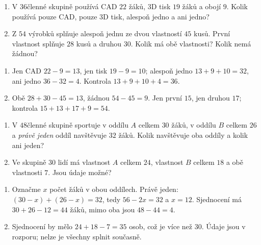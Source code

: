 \documentclass[11pt,a4paper]{article}
\begin{document}

\begin{zadaniReseniBox}[title={Samostatná práce 1}]
\begin{enumerate}[label=\alph*)]
\item V $36$členné skupině používá CAD $22$ žáků, 3D tisk $19$ žáků a obojí $9$.
Kolik používá pouze CAD, pouze 3D tisk, alespoň jedno a ani jedno?
\item Z $54$ výrobků splňuje alespoň jednu ze dvou vlastností $45$ kusů.
První vlastnost splňuje $28$ kusů a druhou $30$. Kolik má obě vlastnosti?
Kolik nemá žádnou?
\end{enumerate}
\tcblower
\begin{enumerate}[label=\alph*)]
\item Jen CAD $22-9=13$, jen tisk $19-9=10$; alespoň jedno
$13+9+10=32$, ani jedno $36-32=4$. Kontrola $13+9+10+4=36$.
\item Obě $28+30-45=13$, žádnou $54-45=9$.
Jen první $15$, jen druhou $17$; kontrola $15+13+17+9=54$.
\end{enumerate}
\end{zadaniReseniBox}

\begin{zadaniReseniBox}[title={Samostatná práce 2},breakable=false]
\begin{enumerate}[label=\alph*)]
\item V $48$členné skupině sportuje v oddílu $A$ celkem $30$ žáků,
v oddílu $B$ celkem $26$ a \emph{právě jeden} oddíl navštěvuje $32$ žáků.
Kolik navštěvuje oba oddíly a kolik ani jeden?
\item Ve skupině $30$ lidí má vlastnost $A$ celkem $24$,
vlastnost $B$ celkem $18$ a obě vlastnosti $7$. Jsou údaje možné?
\end{enumerate}
\tcblower
\begin{enumerate}[label=\alph*)]
\item Označme $x$ počet žáků v obou oddílech. Právě jeden:
$(30-x)+(26-x)=32$, tedy $56-2x=32$ a $x=12$.
Sjednocení má $30+26-12=44$ žáků, mimo oba jsou $48-44=4$.
\item Sjednocení by mělo $24+18-7=35$ osob, což je více než $30$.
Údaje jsou v rozporu; nelze je všechny splnit současně.
\end{enumerate}
\end{zadaniReseniBox}
\end{document}

